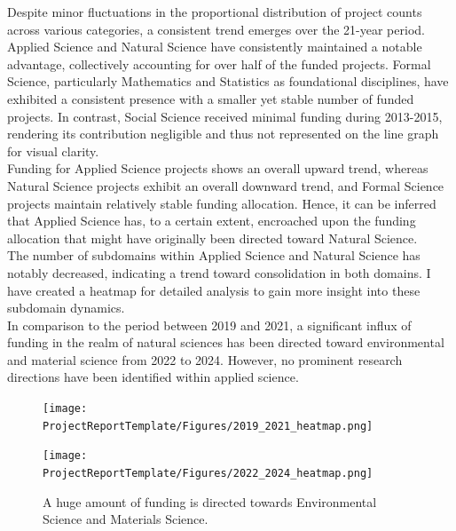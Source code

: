 Despite minor fluctuations in the proportional distribution of project counts across various categories, a consistent trend emerges over the 21-year period. Applied Science and Natural Science have consistently maintained a notable advantage, collectively accounting for over half of the funded projects. Formal Science, particularly Mathematics and Statistics as foundational disciplines, have exhibited a consistent presence with a smaller yet stable number of funded projects. In contrast, Social Science received minimal funding during 2013-2015, rendering its contribution negligible and thus not represented on the line graph for visual clarity.\\


Funding for Applied Science projects shows an overall upward trend, whereas Natural Science projects exhibit an overall downward trend, and Formal Science projects maintain relatively stable funding allocation. Hence, it can be inferred that Applied Science has, to a certain extent, encroached upon the funding allocation that might have originally been directed toward Natural Science.\\

The number of subdomains within Applied Science and Natural Science has notably decreased, indicating a trend toward consolidation in both domains. I have created a heatmap for detailed analysis to gain more insight into these subdomain dynamics.\\

In comparison to the period between 2019 and 2021, a significant influx of funding in the realm of natural sciences has been directed toward environmental and material science from 2022 to 2024. However, no prominent research directions have been identified within applied science.
\begin{figure}[H]
    \centering
    \begin{minipage}{\textwidth}
        \centering
        \texttt{[image: ProjectReportTemplate/Figures/2019\_2021\_heatmap.png]}
      
    \end{minipage}

    \begin{minipage}{\textwidth}
        \centering
        \texttt{[image: ProjectReportTemplate/Figures/2022\_2024\_heatmap.png]}
       
    \end{minipage}
 
    \caption[Project Counts distribution of Applied Science and Natural Science]{A huge amount of funding is directed towards Environmental Science and Materials Science.}
    \label{fig:combined}
\end{figure}


